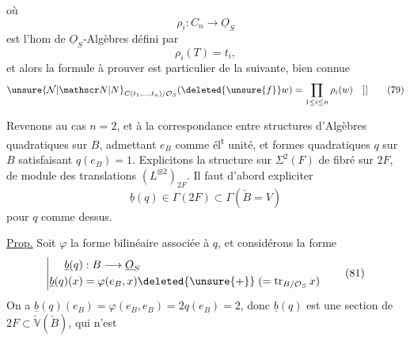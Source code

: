 où
\[
\rho_i:C_n\longrightarrow\underline O_S \tag*{(77)}
\]
est l'hom de $\underline O_S$-Algèbres défini par
\[
\rho_i(T)=t_i, \tag*{(78)}
\]
et alors la formule à prouver est  particulier
de la suivante, bien connue
\[
 \unsure{\mathcal N|\mathscr N|N}_{C(t_1,\ldots,t_n)/\mathcal O_S}(\deleted{\unsure{f}}w)=\prod_{1\leq i\leq n}\rho_i(w)\quad ]] \tag*{(79)}
\]

Revenons  au cas $n=2$, et à la correspondance
entre structures d'Algèbres quadratiques
sur $B$, admettant $e_B$ comme él\textsuperscript{t} unité, et
 formes quadratiques $q$ sur $B$ satisfaisant
$q(e_B)=1$. Explicitons la structure sur
$\Sigma^2(F)$ de fibré  sur $2F$, de 
module des translations $(L^{\otimes2})_{2F}$. Il
faut d'abord expliciter
\[
\underline b(q)\in\Gamma(2F)\subset\Gamma(\check B=V) \tag*{(80)}
\]
pour $q$ comme dessus. 

\uline{Prop.} Soit $\varphi$ la forme bilinéaire associée à
$q$, et considérons la forme
\[
\left|\begin{aligned}
\underline b(q)&:B\longrightarrow\underline O_S\\
\underline b(q)(x)&=\varphi(e_B,x)\deleted{\unsure{+}}\;(=\mathrm{tr}_{B/\mathcal O_S}\,x)
\end{aligned}\right. \tag*{(81)}
\]
On a $\underline b(q)(e_B)=\varphi(e_B,e_B)=2q(e_B)=2$, donc
$\underline b(q)$ est une section de $2F\subset\check{\mathbb V}(\check B)$, qui n'est
